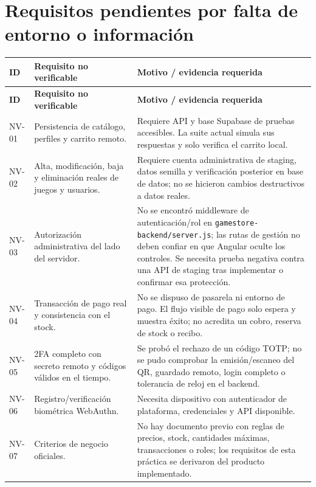 \documentclass[11pt,letterpaper]{article}
\begin{document}
\section{Requisitos pendientes por falta de entorno o información}
\begin{longtable}{>{\raggedright\arraybackslash}p{1.5cm}
                  >{\raggedright\arraybackslash}p{4.9cm}
                  >{\raggedright\arraybackslash}p{8.3cm}}
\toprule
\textbf{ID} & \textbf{Requisito no verificable} & \textbf{Motivo / evidencia requerida}\\
\midrule
\endfirsthead
\toprule
\textbf{ID} & \textbf{Requisito no verificable} & \textbf{Motivo / evidencia requerida}\\
\midrule
\endhead
NV-01 & Persistencia de catálogo, perfiles y carrito remoto. &
Requiere API y base Supabase de pruebas accesibles. La suite actual simula sus respuestas y solo
verifica el carrito local.\\
NV-02 & Alta, modificación, baja y eliminación reales de juegos y usuarios. &
Requiere cuenta administrativa de staging, datos semilla y verificación posterior en base de
datos; no se hicieron cambios destructivos a datos reales.\\
NV-03 & Autorización administrativa del lado del servidor. &
No se encontró middleware de autenticación/rol en \texttt{gamestore-backend/server.js}; las rutas
de gestión no deben confiar en que Angular oculte los controles. Se necesita prueba negativa
contra una API de staging tras implementar o confirmar esa protección.\\
NV-04 & Transacción de pago real y consistencia con el stock. &
No se dispuso de pasarela ni entorno de pago. El flujo visible de pago solo espera y muestra éxito;
no acredita un cobro, reserva de stock o recibo.\\
NV-05 & 2FA completo con secreto remoto y códigos válidos en el tiempo. &
Se probó el rechazo de un código TOTP; no se pudo comprobar la emisión/escaneo del QR, guardado
remoto, login completo o tolerancia de reloj en el backend.\\
NV-06 & Registro/verificación biométrica WebAuthn. &
Necesita dispositivo con autenticador de plataforma, credenciales y API disponible.\\
NV-07 & Criterios de negocio oficiales. &
No hay documento previo con reglas de precios, stock, cantidades máximas, transacciones o roles;
los requisitos de esta práctica se derivaron del producto implementado.\\
\bottomrule
\end{longtable}
\end{document}
